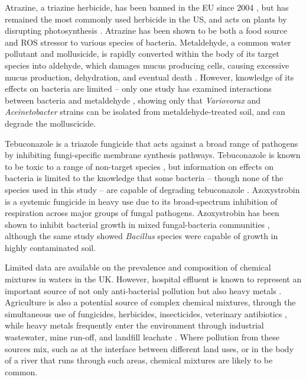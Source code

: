 \documentclass[final,1p,times]{elsarticle}
\begin{document}
Atrazine, a triazine herbicide, has been banned in the EU since 2004 \cite{EU2004}, but has remained the most commonly used herbicide in the US, and acts on plants by disrupting photosynthesis \cite{Shimabukuro1969}. Atrazine has been shown to be both a food source \cite{Wackett2002} and ROS stressor \cite{Zhang2012} to various species of bacteria. Metaldehyde, a common water pollutant and mollusicide, is rapidly converted within the body of its target species into aldehyde, which damages mucus producing cells, causing excessive mucus production, dehydration, and eventual death \cite{Triebskorn1998}. However, knowledge of its effects on bacteria are limited -- only one study has examined interactions between bacteria and metaldehyde \cite{Thomas2017}, showing only that \textit{Variovorax} and \textit{Aceinetobacter} strains can be isolated from metaldehyde-treated soil, and can degrade the molluscicide.

Tebuconazole is a triazole fungicide that acts against a broad range of pathogens by inhibiting fungi-specific membrane synthesis pathways. Tebuconazole is known to be toxic to a range of non-target species \cite{Sehnem2010}, but information on effects on bacteria is limited to the knowledge that some bacteria -- though none of the species used in this study -- are capable of degrading tebuconazole \cite{Sehnem2010}. Azoxystrobin is a systemic fungicide in heavy use due to its broad-spectrum inhibition of respiration across major groups of fungal pathogens. Azoxystrobin has been shown to inhibit bacterial growth in mixed fungal-bacteria communities \cite{Bacmaga2015MicrobialAzoxystrobin}, although the same study showed \textit{Bacillus} species were capable of growth in highly contaminated soil.

Limited data are available on the prevalence and composition of chemical mixtures in waters in the UK. However, hospital effluent is known to represent an important source of not only anti-bacterial pollution \cite{Sacher2001} but also heavy metals \cite{Verlicchi2010}. Agriculture is also a potential source of complex chemical mixtures, through the simultaneous use of fungicides, herbicides, insecticides, veterinary antibiotics \cite{Stuart2012}, while heavy metals frequently enter the environment through industrial wastewater, mine run-off, and landfill leachate \cite{Facchinelli2001}. Where pollution from these sources mix, such as at the interface between different land uses, or in the body of a river that runs through such areas, chemical mixtures are likely to be common.
\end{document}
